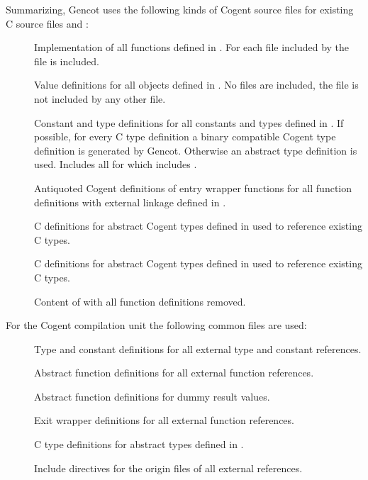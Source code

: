 Summarizing, Gencot uses the following kinds of Cogent source files for existing C source files  and :
\begin{description}
\item[] Implementation of all functions defined in . For each file  included by
   the file  is included.
\item[] Value definitions for all objects defined in . No files are included, the file is not
  included by any other file.
\item[] Constant and type definitions for all constants and types defined in . 
  If possible, for every C type definition a binary compatible Cogent type 
  definition is generated by Gencot. Otherwise an abstract type definition is used. Includes
  all  for which  includes .
\item[] Antiquoted Cogent definitions of entry wrapper functions for all function definitions with external linkage
  defined in .
\item[] C definitions for abstract Cogent types defined in  used to reference existing C types.
\item[] C definitions for abstract Cogent types defined in  used to reference existing C types.
\item[] Content of  with all function definitions removed.
\end{description}

For the Cogent compilation unit the following common files are used:
\begin{description}
\item[] Type and constant definitions for all external type and constant references.
\item[] Abstract function definitions for all external function references.
\item[] Abstract function definitions for dummy result values.
\item[] Exit wrapper definitions for all external function references.
\item[] C type definitions for abstract types defined in .
\item[] Include directives for the origin files of all external references.
\end{description}

